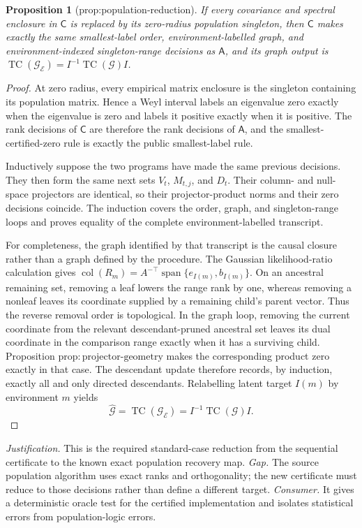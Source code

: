 \documentclass{article}
\newtheorem{proposition}{Proposition}
\begin{document}
\begin{proposition}[prop:population-reduction]\label{prop:population-reduction}
If every covariance and spectral enclosure in \(\mathsf C\) is replaced by its zero-radius population singleton, then \(\mathsf C\) makes exactly the same smallest-label order, environment-labelled graph, and environment-indexed singleton-range decisions as \(\mathsf A\), and its graph output is \(\operatorname{TC}(\mathcal G_{\mathcal E})=I^{-1}\operatorname{TC}(\mathcal G)I\).
\end{proposition}
\begin{proof}
At zero radius, every empirical matrix enclosure is the singleton containing its population matrix.  Hence a Weyl interval labels an eigenvalue zero exactly when the eigenvalue is zero and labels it positive exactly when it is positive.  The rank decisions of \(\mathsf C\) are therefore the rank decisions of \(\mathsf A\), and the smallest-certified-zero rule is exactly the public smallest-label rule.

Inductively suppose the two programs have made the same previous decisions.  They then form the same next sets \(V_t\), \(M_{t,j}\), and \(D_t\).  Their column- and null-space projectors are identical, so their projector-product norms and their zero decisions coincide.  The induction covers the order, graph, and singleton-range loops and proves equality of the complete environment-labelled transcript.

For completeness, the graph identified by that transcript is the causal closure rather than a graph defined by the procedure.  The Gaussian likelihood-ratio calculation gives
\(\operatorname{col}(R_m)=A^{-\top}\operatorname{span}\{e_{I(m)},b_{I(m)}\}\).  On an ancestral remaining set, removing a leaf lowers the range rank by one, whereas removing a nonleaf leaves its coordinate supplied by a remaining child's parent vector.  Thus the reverse removal order is topological.  In the graph loop, removing the current coordinate from the relevant descendant-pruned ancestral set leaves its dual coordinate in the comparison range exactly when it has a surviving child.  Proposition \(\mathrm{prop{:}projector\mbox{-}geometry}\) makes the corresponding product zero exactly in that case.  The descendant update therefore records, by induction, exactly all and only directed descendants.  Relabelling latent target \(I(m)\) by environment \(m\) yields
\[
 \widehat{\mathcal G}=\operatorname{TC}(\mathcal G_{\mathcal E})
 =I^{-1}\operatorname{TC}(\mathcal G)I.
\]
\end{proof}
\par\smallskip\noindent \textit{Justification.} This is the required standard-case reduction from the sequential certificate to the known exact population recovery map. \textit{Gap.} The source population algorithm uses exact ranks and orthogonality; the new certificate must reduce to those decisions rather than define a different target. \textit{Consumer.} It gives a deterministic oracle test for the certified implementation and isolates statistical errors from population-logic errors.
\end{document}
